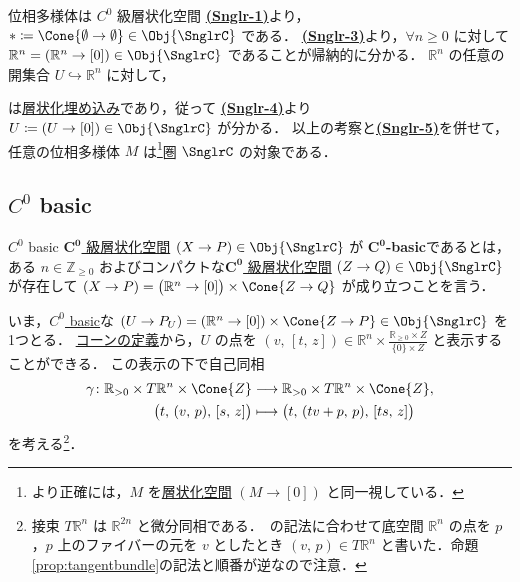 \documentclass[TQFT_main]{subfiles}
\begin{document}
\begin{myexample}[label=ex:topomfld]{位相多様体は $C^0$ 級層状化空間}
    \hyperref[def:Snglr-C0]{\textsf{\textbf{(Snglr-1)}}}より，$* \coloneqq \Cone{\emptyset \to \emptyset} \in \Obj{\SnglrC}$ である．
    \hyperref[def:Snglr-C0]{\textsf{\textbf{(Snglr-3)}}}より，$\forall n \ge 0$ に対して $\mathbb{R}^n = (\mathbb{R}^n \to [0]) \in \Obj{\SnglrC}$ であることが帰納的に分かる．
    $\mathbb{R}^n$ の任意の開集合 $U \hookrightarrow \mathbb{R}^n$ に対して，
    \begin{center}
    \end{center}
    は\hyperref[def:strat-emb]{層状化埋め込み}であり，従って \hyperref[def:Snglr-C0]{\textsf{\textbf{(Snglr-4)}}}より $U \coloneqq (U \to [0]) \in \Obj{\SnglrC}$ が分かる．
    以上の考察と\hyperref[def:Snglr-C0]{\textsf{\textbf{(Snglr-5)}}}を併せて，任意の位相多様体 $M$ は\footnote{より正確には，$M$ を\hyperref[def:stratified-space]{層状化空間} $(M \to [0])$ と同一視している．}圏 $\SnglrC$ の対象である．
\end{myexample}

\subsection{$C^0$ basic}

\begin{mydef}[label=def:C0-basic]{$C^0$ basic}
    \hyperref[def:Snglr-C0]{$\bm{C^0}$ 級層状化空間} $(X \to P) \in \Obj{\SnglrC}$ が $\bm{C^0}$\textbf{-basic}であるとは，ある $n \in \mathbb{Z}_{\ge 0}$ およびコンパクトな\hyperref[def:Snglr-C0]{$\bm{C^0}$ 級層状化空間} $(Z \to Q) \in \Obj{\SnglrC}$ が存在して
    $(X \to P) = \bigl(\mathbb{R}^n \to [0]\bigr) \times \Cone{Z \to Q}$ が成り立つことを言う．
\end{mydef}

いま，\hyperref[def:C0-basic]{$C^0$ basic}な $(U \to P_U) = (\mathbb{R}^n \to [0]) \times \Cone{Z \to P} \in \Obj{\SnglrC}$ を1つとる．
\hyperref[def:str-cone]{コーンの定義}から，$U$ の点を $(v,\, [t,\, z]) \in \mathbb{R}^n \times \frac{\mathbb{R}_{\ge 0} \times Z}{\{0\} \times Z}$ と表示することができる．
この表示の下で自己同相
\begin{align}
    \gamma \colon \mathbb{R}_{> 0} \times T \mathbb{R}^n \times \Cone{Z} &\lto \mathbb{R}_{> 0} \times T \mathbb{R}^n \times \Cone{Z}, \\
    \bigl( t,\, (v,\, p),\, [s,\, z] \bigr) &\lmto \bigl( t,\, (tv + p,\, p),\, [ts,\, z] \bigr)
\end{align}
を考える\footnote{接束 $T\mathbb{R}^n$ は $\mathbb{R}^{2n}$ と微分同相である．~\cite[p.23]{AFT2014stratified}の記法に合わせて底空間 $\mathbb{R}^n$ の点を $p$，$p$ 上のファイバーの元を $v$ としたとき $(v,\, p) \in T \mathbb{R}^n$ と書いた．命題\ref{prop:tangentbundle}の記法と順番が逆なので注意．}．
\end{document}
